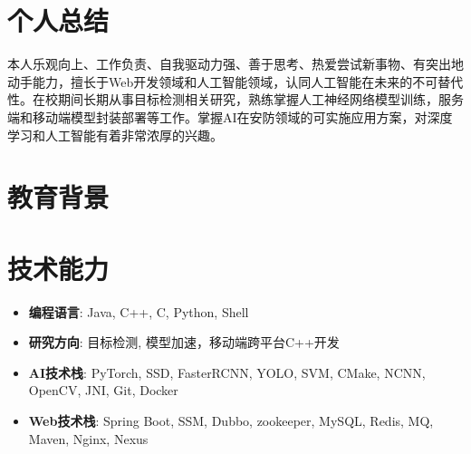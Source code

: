 \documentclass{resume}
\begin{document}


 
\section{个人总结}
本人乐观向上、工作负责、自我驱动力强、善于思考、热爱尝试新事物、有突出地动手能力，擅长于Web开发领域和人工智能领域，认同人工智能在未来的不可替代性。在校期间长期从事目标检测相关研究，熟练掌握人工神经网络模型训练，服务端和移动端模型封装部署等工作。掌握AI在安防领域的可实施应用方案，对深度学习和人工智能有着非常浓厚的兴趣。

\section{教育背景}

\section{技术能力}
\begin{itemize}[parsep=0.2ex]
  \item \textbf{编程语言}: Java, C++, C, Python, Shell
  \item \textbf{研究方向}: 目标检测, 模型加速，移动端跨平台C++开发
  \item \textbf{AI技术栈}: PyTorch, SSD, FasterRCNN, YOLO, SVM, CMake, NCNN, OpenCV, JNI, Git, Docker
  \item \textbf{Web技术栈}: Spring Boot, SSM, Dubbo, zookeeper, MySQL, Redis, MQ, Maven, Nginx, Nexus
\end{itemize}
\end{document}
